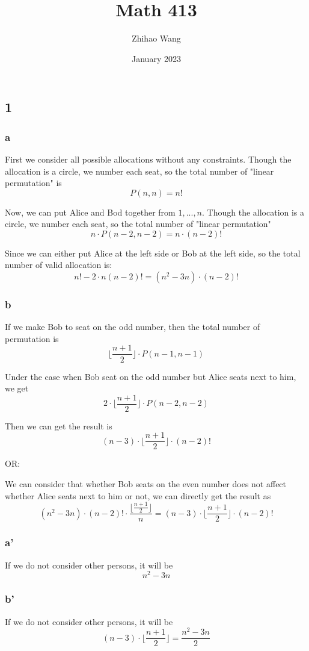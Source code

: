 \documentclass{article}
\title{Math 413}
\author{Zhihao Wang}
\date{January 2023}
\begin{document}
\maketitle

\subsection*{1}
\subsubsection*{a}
First we consider all possible allocations without any constraints. Though the allocation is a circle, we number each seat, so the total number of "linear permutation" is $${P(n, n)} = n!$$

Now, we can put Alice and Bod together from $1, ..., n$. Though the allocation is a circle, we number each seat, so the total number of "linear permutation" $$n \cdot {P(n - 2, n - 2)} = n \cdot (n - 2)!$$

Since we can either put Alice at the left side or Bob at the left side, so the total number of valid allocation is: $$n! - 2 \cdot n(n - 2)! = (n^2 - 3n) \cdot (n - 2)!$$

\subsubsection*{b}
If we make Bob to seat on the odd number, then the total number of permutation is 
$${\lfloor \frac{n + 1}{2} \rfloor} \cdot P(n-1, n-1)$$

Under the case when Bob seat on the odd number but Alice seats next to him, we get 
$$2 \cdot \lfloor {\frac{n + 1}{2} }\rfloor \cdot P(n-2, n-2)$$

Then we can get the result is $$(n - 3) \cdot \lfloor {\frac{n + 1}{2} } \rfloor \cdot (n - 2)!$$

OR:

We can consider that whether Bob seats on the even number does not affect whether Alice seats next to him or not, we can directly get the result as $$(n^2 - 3n) \cdot (n - 2)! \cdot \frac{\lfloor {\frac{n + 1}{2} }\rfloor }{n} = (n - 3) \cdot \lfloor {\frac{n + 1}{2} } \rfloor \cdot (n - 2)!$$
\subsubsection*{a'}
If we do not consider other persons, it will be 
$$n^2 - 3n$$
\subsubsection*{b'}
If we do not consider other persons, it will be 
$$(n - 3) \cdot \lfloor {\frac{n + 1}{2} } \rfloor = \frac{n^2 - 3n}{2}$$
\end{document}
